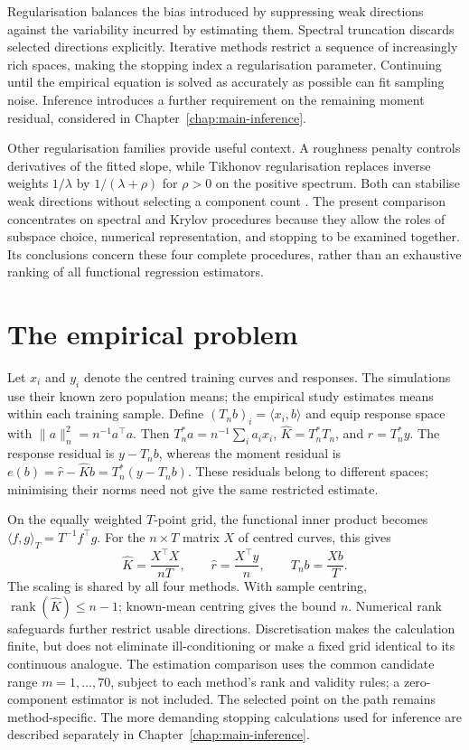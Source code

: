 Regularisation balances the bias introduced by suppressing weak directions
against the variability incurred by estimating them. Spectral truncation
discards selected directions explicitly. Iterative methods restrict a
sequence of increasingly rich spaces, making the stopping index a
regularisation parameter. Continuing until the empirical equation is solved
as accurately as possible can fit sampling noise. Inference introduces a
further requirement on the remaining moment residual, considered in
Chapter~\ref{chap:main-inference}.

Other regularisation families provide useful context. A roughness penalty
controls derivatives of the fitted slope, while Tikhonov regularisation
replaces inverse weights $1/\lambda$ by $1/(\lambda+\rho)$ for
$\rho>0$ on the positive spectrum. Both can stabilise weak directions
without selecting a component count
\parencite{cardot_ferraty_sarda_2003,crambes_kneip_sarda_2009}.
The present comparison concentrates on spectral and Krylov procedures
because they allow the roles of subspace choice, numerical representation,
and stopping to be examined together. Its conclusions concern these four
complete procedures, rather than an exhaustive ranking of all functional
regression estimators.

\section{The empirical problem}

Let $x_i$ and $y_i$ denote the centred training curves and responses. The
simulations use their known zero population means; the empirical study
estimates means within each training sample. Define
$(T_nb)_i=\langle x_i,b\rangle$ and equip response space with
$\|a\|_n^2=n^{-1}a^\top a$. Then
$T_n^*a=n^{-1}\sum_i a_ix_i$,
$\widehat K=T_n^*T_n$, and $\widehat r=T_n^*y$.
The response residual is $y-T_nb$, whereas the moment residual is
$e(b)=\widehat r-\widehat Kb=T_n^*(y-T_nb)$.
These residuals belong to different spaces; minimising their norms need not
give the same restricted estimate.

On the equally weighted $T$-point grid, the functional inner product becomes
$\langle f,g\rangle_T=T^{-1}f^\top g$. For the $n\times T$ matrix $X$ of
centred curves, this gives
\begin{equation}
 \widehat K=\frac{X^\top X}{nT},\qquad
 \widehat r=\frac{X^\top y}{n},\qquad
 T_nb=\frac{Xb}{T}.
 \label{main:eq:grid-moments}
\end{equation}
The scaling is shared by all four methods. With sample centring,
$\operatorname{rank}(\widehat K)\leq n-1$; known-mean centring gives the
bound $n$. Numerical rank safeguards further restrict usable directions.
Discretisation makes the calculation finite, but does not eliminate
ill-conditioning or make a fixed grid identical to its continuous analogue.
The estimation comparison uses the common candidate range
$m=1,\ldots,70$, subject to each method's rank and validity rules; a
zero-component estimator is not included. The selected point on the path
remains method-specific. The more demanding stopping calculations used for
inference are described separately in Chapter~\ref{chap:main-inference}.

